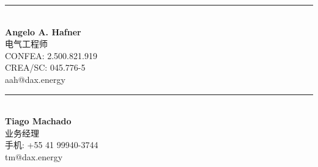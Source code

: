 \documentclass[a4paper]{article}
\begin{document}
	\noindent %
	\begin{minipage}[t]{0.5\textwidth} %
		\centering %
		\vspace{5cm} %
		\rule{6cm}{0.4pt}\\ %
		\textbf{Angelo A. Hafner}\\ %
		电气工程师\\ %
		CONFEA: 2.500.821.919\\ %
		CREA/SC: 045.776-5\\ %
		aah@dax.energy %
	\end{minipage}%
	\hfill %
	\begin{minipage}[t]{0.5\textwidth} %
		\centering %
		\vspace{5cm} %
		\rule{6cm}{0.4pt}\\ %
		\textbf{Tiago Machado}\\ %
		业务经理\\ %
		手机: +55 41 99940-3744\\ %
		tm@dax.energy %
	\end{minipage}
	
\end{document}

